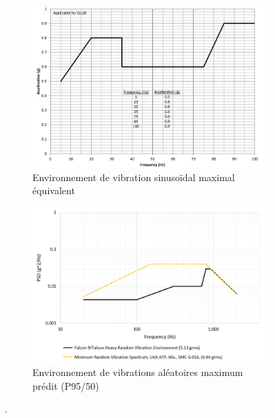 \begin{figure}[h]
\begin{subfigure}[]{0.48\textwidth}
         \label{fig:falcon9_acoustic}
     \end{subfigure}
     \\
     \begin{subfigure}[]{0.48\textwidth}
         \centering
         \includegraphics[width=\textwidth]{Img/falcon_sine.png}
         \caption{Environnement de vibration sinusoïdal maximal équivalent}
         \label{fig:falcon_sine}
     \end{subfigure}
     \hfill     
     \begin{subfigure}[]{0.48\textwidth}
         \centering
         \includegraphics[width=\textwidth]{Img/falcon_random.png}
         \caption{Environnement de vibrations aléatoires maximum prédit (P95/50)}
         \label{fig:falcon_random}
     \end{subfigure}
     \caption{ }.
     \label{fig:Falcon9}
\end{figure}